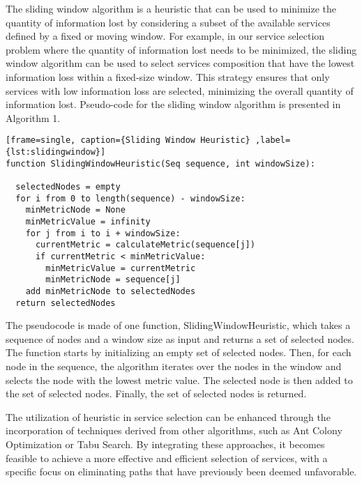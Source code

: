 The sliding window algorithm is a heuristic that can be used to minimize the quantity of information lost by considering a subset of the available services defined by a fixed or moving window.
For example, in our service selection problem where the quantity of information lost needs to be minimized,
the sliding window algorithm can be used to select services composition that have the lowest information loss within a fixed-size window.
This strategy ensures that only services with low information loss are selected, minimizing the overall quantity of information lost.
Pseudo-code for the sliding window algorithm is presented in Algorithm 1.
\begin{lstlisting}[frame=single, caption={Sliding Window Heuristic} ,label={lst:slidingwindow}]
function SlidingWindowHeuristic(Seq sequence, int windowSize):

  selectedNodes = empty
  for i from 0 to length(sequence) - windowSize:
    minMetricNode = None
    minMetricValue = infinity
    for j from i to i + windowSize:
      currentMetric = calculateMetric(sequence[j])
      if currentMetric < minMetricValue:
        minMetricValue = currentMetric
        minMetricNode = sequence[j]
    add minMetricNode to selectedNodes
  return selectedNodes
\end{lstlisting}
The pseudocode is made of one function, SlidingWindowHeuristic, which takes a sequence of nodes and a window size as input and returns a set of selected nodes.
The function starts by initializing an empty set of selected nodes.
Then, for each node in the sequence, the algorithm iterates over the nodes in the window and selects the node with the lowest metric value.
The selected node is then added to the set of selected nodes.
Finally, the set of selected nodes is returned.


The utilization of heuristic in service selection can be enhanced through the incorporation of techniques derived from other algorithms, such as Ant Colony Optimization or Tabu Search.
By integrating these approaches, it becomes feasible to achieve a more effective and efficient selection of services, with a specific focus on eliminating paths that have previously been deemed unfavorable.

